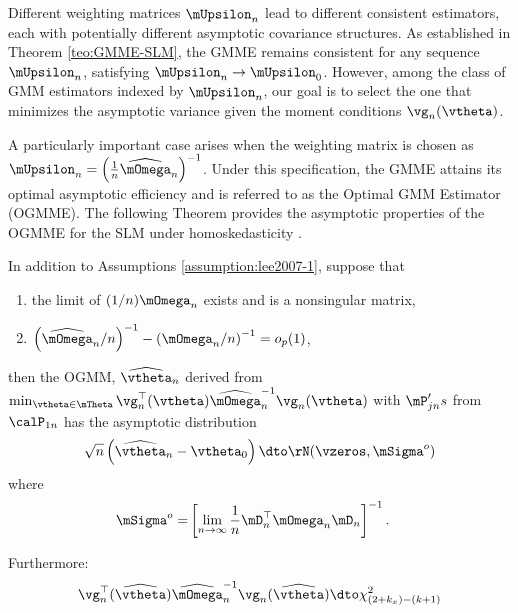 \documentclass[english,12pt]{book}\usepackage[]{graphicx}\usepackage[]{xcolor}
\begin{document}
Different weighting matrices $\mUpsilon_n$ lead to different consistent estimators, each with potentially different asymptotic covariance structures. As established in Theorem \ref{teo:GMME-SLM}, the GMME remains consistent for any sequence $\mUpsilon_n$, satisfying $\mUpsilon_n \to \mUpsilon_0$. However, among the class of GMM estimators indexed by $\mUpsilon_n$, our goal is to select the one that minimizes the asymptotic variance given the moment conditions $\vg_n(\vtheta)$. 

A particularly important case arises when the weighting matrix is chosen as $\mUpsilon_n = \left(\frac{1}{n}\widehat{\mOmega}_n\right)^{-1}$. Under this specification, the GMME attains its optimal asymptotic efficiency and is referred to as the Optimal GMM Estimator (OGMME). The following Theorem provides the asymptotic properties of the OGMME for the SLM under homoskedasticity \citep{lee2007gmm}.

\begin{theorem}
In addition to  Assumptions \ref{assumption:lee2007-1}, suppose that 
\begin{enumerate}
  \item the limit of $(1/n)\mOmega_n$ exists and is a nonsingular matrix, 
  \item $\left(\widehat{\mOmega}_n / n\right)^{-1} -\left(\mOmega_n / n\right)^{-1} = o_p(1)$, 
\end{enumerate}
%
then the OGMM, $\widehat{\vtheta}_{n}$ derived from $\min_{\vtheta \in \mTheta}\vg_n^\top(\vtheta)\widehat{\mOmega}_n^{-1}\vg_n(\vtheta)$ with $\mP_{jn}'s$ from $\calP_{1n}$ has the asymptotic distribution
\begin{equation*}
\sqrt{n}\left(\widehat{\vtheta}_n - \vtheta_0\right) \dto \rN(\vzeros, \mSigma^o)
\end{equation*}
%
where
\begin{equation*}
\begin{aligned}
  \mSigma^o = &  \left[\lim_{n\to\infty}\frac{1}{n}\mD_n^\top\mOmega_n\mD_n\right]^{-1}.
  \end{aligned}
\end{equation*}

Furthermore:
\begin{equation*}
\vg_n^\top(\widehat{\vtheta})\widehat{\mOmega}_n^{-1}\vg_n(\widehat{\vtheta}) \dto \chi^2_{(2 + k_x)- (k + 1)}
\end{equation*}
\end{theorem}
\end{document}
